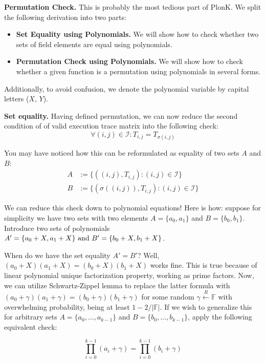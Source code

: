 \documentclass[../lecture-notes-148x210.tex]{subfiles}
\begin{document}
\textcolor{green!60!black}{\textbf{Permutation Check.}} This is probably the most
tedious part of PlonK. We split the following derivation into two parts:
\begin{itemize}
    \item \textbf{Set Equality using Polynomials.} We will show how to check
    whether two sets of field elements are equal using polynomials.
    \item \textbf{Permutation Check using Polynomials.} We will show how to
    check whether a given function is a permutation using polynomials in several 
    forms.
\end{itemize}

Additionally, to avoid confusion, we denote the polynomial variable by capital letters ($X$, $Y$).

\textbf{Set equality.} Having defined permutation, we can now reduce the second
condition of  of valid execution trace matrix into
the following check:
\[\forall (i, j) \in \mathcal{I}: T_{i,j} = T_{\sigma(i,j)}\]

You may have noticed how this can be reformulated as equality of two sets $A$ and $B$:
\begin{align*}
    A &:= \{((i, j), T_{i,j}) : (i, j) \in \mathcal{I}\} \\
    B &:= \{(\sigma((i, j)), T_{i,j}) : (i, j) \in \mathcal{I}\}
\end{align*}

We can reduce this check down to polynomial equations! Here is how: suppose for
simplicity we have two sets with two elements \(A = \{a_0, a_1\}\) and \(B =
\{b_0, b_1\}\). Introduce two sets of polynomials \(A' = \{a_0 + X, a_1 +
X\}$ and $B' = \{b_0 + X, b_1 + X\}\). 

When do we have the set equality \(A' = B'\)? Well, \((a_0 + X)(a_1 + X) = (b_0
+ X)(b_1 + X)\) works fine. This is true because of linear polynomial unique
factorization property, working as prime factors. Now, we can utilize
Schwartz-Zippel lemma to replace the latter formula with \((a_0 + \gamma)(a_1 +
\gamma) = (b_0 + \gamma)(b_1 + \gamma)\) for some random $\gamma \xleftarrow{R}
\mathbb{F}$ with overwhelming probability, being at least $1-2/|\mathbb{F}|$. If we
wish to generalize this for arbitrary sets \(A = \{a_0, \ldots, a_{k-1}\}\) and
\(B = \{b_0, \ldots, b_{k-1}\}\), apply the following equivalent check:

\[\prod_{i=0}^{k-1} (a_i + \gamma) = \prod_{i=0}^{k-1} (b_i + \gamma)\]
\end{document}
